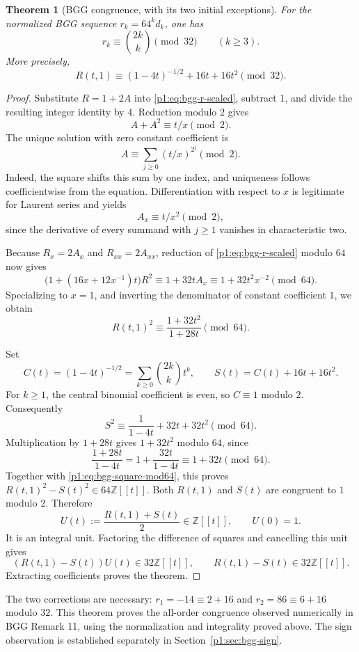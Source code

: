\documentclass[11pt,a4paper]{article}
\newtheorem{theorem}{Theorem}[section]
\theoremstyle{definition}
\theoremstyle{remark}
\numberwithin{equation}{section}
\begin{document}
\begin{theorem}[BGG congruence, with its two initial exceptions]
For the normalized BGG sequence $r_k=64^k d_k$, one has
\[
 r_k\equiv\binom{2k}{k}\pmod {32}\qquad(k\geq3).
\]
More precisely,
\[
 R(t,1)\equiv(1-4t)^{-1/2}+16t+16t^2\pmod {32}.
\]
\end{theorem}
\begin{proof}
Substitute $R=1+2A$ into \eqref{p1:eq:bgg-r-scaled}, subtract $1$, and divide
the resulting integer identity by $4$. Reduction modulo $2$ gives
\[
 A+A^2\equiv t/x\pmod2.
\]
The unique solution with zero constant coefficient is
\[
 A\equiv\sum_{j\geq0}(t/x)^{2^j}\pmod2.
\]
Indeed, the square shifts this sum by one index, and uniqueness follows
coefficientwise from the equation. Differentiation with respect to $x$
is legitimate for Laurent series and yields
\[
 A_x\equiv t/x^2\pmod2,
\]
since the derivative of every summand with $j\geq1$ vanishes in
characteristic two.

Because $R_x=2A_x$ and $R_{xx}=2A_{xx}$, reduction of
\eqref{p1:eq:bgg-r-scaled} modulo $64$ now gives
\[
 \bigl(1+(16x+12x^{-1})t\bigr)R^2
 \equiv1+32tA_x\equiv1+32t^2x^{-2}\pmod{64}.
\]
Specializing to $x=1$, and inverting the denominator of constant
coefficient $1$, we obtain
\begin{equation}\label{p1:eq:bgg-square-mod64}
 R(t,1)^2\equiv\frac{1+32t^2}{1+28t}\pmod{64}.
\end{equation}

Set
\[
 C(t)=(1-4t)^{-1/2}=\sum_{k\geq0}\binom{2k}{k}t^k,
 \qquad S(t)=C(t)+16t+16t^2.
\]
For $k\geq1$, the central binomial coefficient is even, so $C\equiv1$
modulo $2$. Consequently
\[
 S^2\equiv\frac1{1-4t}+32t+32t^2\pmod{64}.
\]
Multiplication by $1+28t$ gives $1+32t^2$ modulo $64$, since
\[
 \frac{1+28t}{1-4t}=1+\frac{32t}{1-4t}\equiv1+32t\pmod{64}.
\]
Together with \eqref{p1:eq:bgg-square-mod64}, this proves
$R(t,1)^2-S(t)^2\in64\mathbb Z[[t]]$.
Both $R(t,1)$ and $S(t)$ are congruent to $1$ modulo $2$. Therefore
\[
 U(t):=\frac{R(t,1)+S(t)}2\in\mathbb Z[[t]],\qquad U(0)=1.
\]
It is an integral unit. Factoring the difference of squares and cancelling
this unit gives
\[
 (R(t,1)-S(t))U(t)\in32\mathbb Z[[t]],
 \qquad R(t,1)-S(t)\in32\mathbb Z[[t]].
\]
Extracting coefficients proves the theorem.
\end{proof}

The two corrections are necessary: $r_1=-14\equiv2+16$ and
$r_2=86\equiv6+16$ modulo $32$. This theorem proves the all-order
congruence observed numerically in BGG Remark 11, using the normalization and integrality proved above. The sign
observation is established separately in Section~\ref{p1:sec:bgg-sign}.
\end{document}
